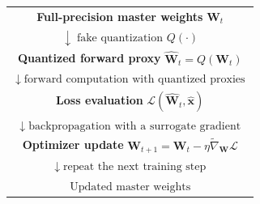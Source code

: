 \begin{center}
\setlength{\fboxsep}{6pt}
\begin{tabular}{c}
    \fbox{\parbox[c][0.82cm][c]{0.60\textwidth}{\centering
        \textbf{Full-precision master weights}\\
        \(\mathbf{W}_t\)}}\\[0.25em]
    \(\downarrow\;\text{fake quantization }Q(\cdot)\)\\[0.2em]
    \fbox{\parbox[c][0.82cm][c]{0.60\textwidth}{\centering
        \textbf{Quantized forward proxy}\\
        \(\widehat{\mathbf{W}}_t=Q(\mathbf{W}_t)\)}}\\[0.25em]
    \(\downarrow\;\text{forward computation with quantized proxies}\)\\[0.2em]
    \fbox{\parbox[c][0.82cm][c]{0.60\textwidth}{\centering
        \textbf{Loss evaluation}\\
        \(\mathcal{L}(\widehat{\mathbf{W}}_t,\widehat{\mathbf{x}})\)}}\\[0.25em]
    \(\downarrow\;\text{backpropagation with a surrogate gradient}\)\\[0.2em]
    \fbox{\parbox[c][0.82cm][c]{0.60\textwidth}{\centering
        \textbf{Optimizer update}\\
        \(\mathbf{W}_{t+1}=\mathbf{W}_t-\eta\widetilde{\nabla}_{\mathbf{W}}\mathcal{L}\)}}\\[0.25em]
    \(\downarrow\;\text{repeat the next training step}\)\\[0.2em]
    \(\boxed{\text{Updated master weights}}\)
\end{tabular}
\end{center}
